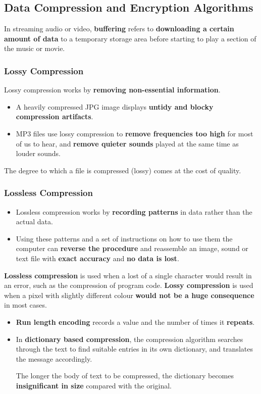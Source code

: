 \subsection{Data Compression and Encryption Algorithms}

In streaming audio or video, \textbf{buffering} refers to \textbf{downloading a certain amount of data} to a temporary storage area before starting to play a section of the music or movie.

\subsubsection*{Lossy Compression}

Lossy compression works by \textbf{removing non-essential information}.
\begin{itemize}
    \item A heavily compressed JPG image displays \textbf{untidy and blocky compression artifacts}.
    \item MP3 files use lossy compression to \textbf{remove frequencies too high} for most of us to hear, and \textbf{remove quieter sounds} played at the same time as louder sounds.
\end{itemize}
The degree to which a file is compressed (lossy) comes at the cost of quality.

\subsubsection*{Lossless Compression}

\begin{itemize}
    \item Lossless compression works by \textbf{recording patterns} in data rather than the actual data.
    \item Using these patterns and a set of instructions on how to use them the computer can \textbf{reverse the procedure} and reassemble an image, sound or text file with \textbf{exact accuracy} and \textbf{no data is lost}.
\end{itemize}

\textbf{Lossless compression} is used when a lost of a single character would result in an error, such as the compression of program code. \textbf{Lossy compression} is used when a pixel with slightly different colour \textbf{would not be a huge consequence} in most cases.

\begin{itemize}
    \item \textbf{Run length encoding} records a value and the number of times it \textbf{repeats}.
    \item In \textbf{dictionary based compression}, the compression algorithm searches through the text to find suitable entries in its own dictionary, and translates the message accordingly.

        The longer the body of text to be compressed, the dictionary becomes \textbf{insignificant in size} compared with the original.
\end{itemize}

